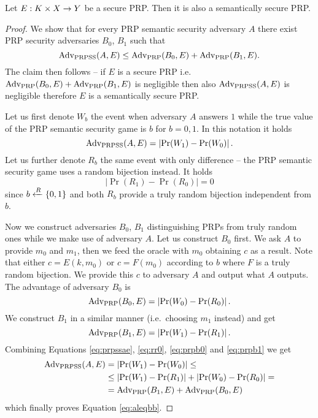 \begin{thm}
\label{thm:semsecprp}
	Let $E: K\times X\rightarrow Y$ be a secure PRP. Then it is also a semantically secure PRP.
\end{thm}
\begin{proof}
	We show that for every PRP semantic security adversary $A$ there exist PRP security adversaries $B_0$, $B_1$ such that
	\begin{equation}\label{eq:aleqbb}
		\operatorname*{Adv_{PRPSS}}(A,E) \leq \operatorname*{Adv_{PRP}}(B_0,E) + \operatorname*{Adv_{PRP}}(B_1,E) .
	\end{equation}
	The claim then follows -- if $E$ is a secure PRP i.e. $\operatorname*{Adv_{PRP}}(B_0,E) + \operatorname*{Adv_{PRP}}(B_1,E)$ is negligible then also $\operatorname*{Adv_{PRPSS}}(A,E)$ is negligible therefore $E$ is a semantically secure PRP.
	
	Let us first denote $W_b$ the event when adversary $A$ answers $1$ while the true value of the PRP semantic security game is $b$ for $b=0,1$. In this notation it holds
	\begin{equation}\label{eq:prpssae}
		\operatorname*{Adv_{PRPSS}}(A,E) = \left| \Pr(W_1) - \Pr(W_0) \right| .
	\end{equation}
	Let us further denote $R_b$ the same event with only difference -- the PRP semantic security game uses a random bijection instead. It holds
	\begin{equation}\label{eq:rr0}
		\left| \Pr(R_1) - \Pr(R_0) \right| = 0
	\end{equation}
	since $b\xleftarrow{R}\{0,1\}$ and both $R_b$ provide a truly random bijection independent from $b$.
	
	Now we construct adversaries $B_0$, $B_1$ distinguishing PRPs from truly random ones while we make use of adversary $A$. Let us construct $B_0$ first. We ask $A$ to provide $m_0$ and $m_1$, then we feed the oracle with $m_0$ obtaining $c$ as a result. Note that either $c=E(k,m_0)$ or $c=F(m_0)$ according to $b$ where $F$ is a truly random bijection. We provide this $c$ to adversary $A$ and output what $A$ outputs. The advantage of adversary $B_0$ is
	\begin{equation}\label{eq:prpb0}
		\operatorname*{Adv_{PRP}}(B_0,E) = \left| \Pr(W_0) - \Pr(R_0) \right| .
	\end{equation}
	We construct $B_1$ in a similar manner (i.e.\ choosing $m_1$ instead) and get
	\begin{equation}\label{eq:prpb1}
		\operatorname*{Adv_{PRP}}(B_1,E) = \left| \Pr(W_1) - \Pr(R_1) \right| .
	\end{equation}
	Combining Equations \ref{eq:prpssae}, \ref{eq:rr0}, \ref{eq:prpb0} and \ref{eq:prpb1} we get
	\begin{align*}
		\operatorname*{Adv_{PRPSS}}(A,E) &= \left| \Pr(W_1) - \Pr(W_0) \right| \leq \\
		&\leq \left| \Pr(W_1) - \Pr(R_1) \right| + \left| \Pr(W_0) - \Pr(R_0) \right| = \\
		&= \operatorname*{Adv_{PRP}}(B_1,E) + \operatorname*{Adv_{PRP}}(B_0,E)
	\end{align*}
	which finally proves Equation \ref{eq:aleqbb}.
\end{proof}

